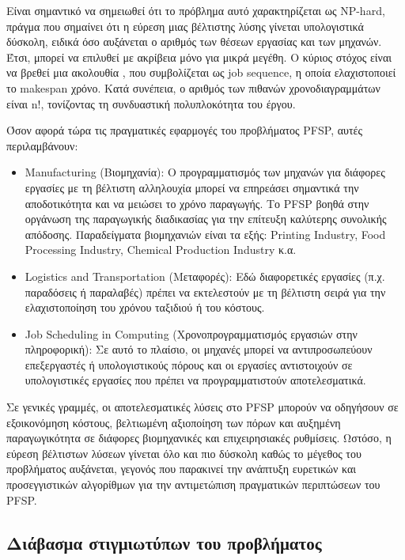 \documentclass[paper=a4, fontsize=11pt]{scrartcl}
\numberwithin{equation}{section}		%
\numberwithin{figure}{section}			%
\numberwithin{table}{section}				%
\begin{document}
    Είναι σημαντικό να σημειωθεί ότι το πρόβλημα αυτό χαρακτηρίζεται ως NP-hard, πράγμα που σημαίνει ότι η εύρεση μιας βέλτιστης λύσης γίνεται υπολογιστικά δύσκολη, ειδικά όσο αυξάνεται ο αριθμός των θέσεων εργασίας και των μηχανών. Έτσι, μπορεί να επιλυθεί με ακρίβεια μόνο για μικρά μεγέθη. Ο κύριος στόχος είναι να βρεθεί μια ακολουθία , που συμβολίζεται ως job sequence, η οποία ελαχιστοποιεί το makespan χρόνο. Κατά συνέπεια, ο αριθμός των πιθανών χρονοδιαγραμμάτων είναι n!, τονίζοντας τη συνδυαστική πολυπλοκότητα του έργου.

    Όσον αφορά τώρα τις πραγματικές εφαρμογές του προβλήματος PFSP, αυτές περιλαμβάνουν:

\begin{itemize}
  \item Manufacturing (Βιομηχανία): Ο προγραμματισμός των μηχανών για διάφορες εργασίες με τη βέλτιστη αλληλουχία μπορεί να επηρεάσει σημαντικά την αποδοτικότητα και να μειώσει το χρόνο παραγωγής. Το PFSP βοηθά στην οργάνωση της παραγωγικής διαδικασίας για την επίτευξη καλύτερης συνολικής απόδοσης. Παραδείγματα βιομηχανιών είναι τα εξής: Printing Industry, Food Processing Industry, Chemical Production Industry κ.α.   
  \item Logistics and Transportation (Μεταφορές): Εδώ διαφορετικές εργασίες (π.χ. παραδόσεις ή παραλαβές) πρέπει να εκτελεστούν με τη βέλτιστη σειρά για την ελαχιστοποίηση του χρόνου ταξιδιού ή του κόστους.
  \item Job Scheduling in Computing (Χρονοπρογραμματισμός εργασιών στην πληροφορική): Σε αυτό το πλαίσιο, οι μηχανές μπορεί να αντιπροσωπεύουν επεξεργαστές ή υπολογιστικούς πόρους και οι εργασίες αντιστοιχούν σε υπολογιστικές εργασίες που πρέπει να προγραμματιστούν αποτελεσματικά.
\end{itemize}

    Σε γενικές γραμμές, οι αποτελεσματικές λύσεις στο PFSP μπορούν να οδηγήσουν σε εξοικονόμηση κόστους, βελτιωμένη αξιοποίηση των πόρων και αυξημένη παραγωγικότητα σε διάφορες βιομηχανικές και επιχειρησιακές ρυθμίσεις. Ωστόσο, η εύρεση βέλτιστων λύσεων γίνεται όλο και πιο δύσκολη καθώς το μέγεθος του προβλήματος αυξάνεται, γεγονός που παρακινεί την ανάπτυξη ευρετικών και προσεγγιστικών αλγορίθμων για την αντιμετώπιση πραγματικών περιπτώσεων του PFSP.

\newpage
\subsection{Διάβασμα στιγμιωτύπων του προβλήματος}
\end{document}
